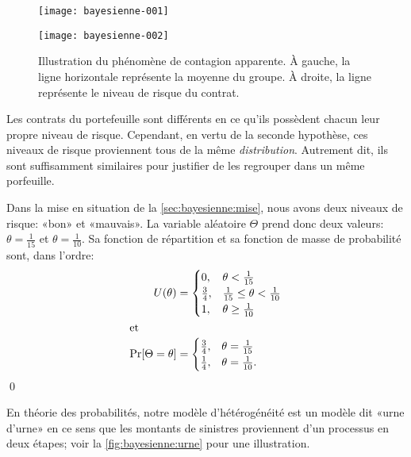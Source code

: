 \begin{figure}
  \centering
  \begin{minipage}{0.48\linewidth}
\texttt{[image: bayesienne-001]}
  \end{minipage}
  \hfill
  \begin{minipage}{0.48\linewidth}
\texttt{[image: bayesienne-002]}
  \end{minipage}
  \caption{Illustration du phénomène de contagion apparente. À gauche,
    la ligne horizontale représente la moyenne du groupe. À droite, la
    ligne représente le niveau de risque du contrat.}
  \label{fig:bayesienne:contagion}
\end{figure}

Les contrats du portefeuille sont différents en ce qu'ils possèdent
chacun leur propre niveau de risque. Cependant, en vertu de la seconde
hypothèse, ces niveaux de risque proviennent tous de la même
\emph{distribution}. Autrement dit, ils sont suffisamment similaires
pour justifier de les regrouper dans un même porfeuille.

\begin{exemple}
  Dans la mise en situation de la \autoref{sec:bayesienne:mise}, nous
  avons deux niveaux de risque: «bon» et «mauvais». La variable
  aléatoire $\Theta$ prend donc deux valeurs: $\theta = \frac{1}{15}$
  et $\theta = \frac{1}{10}$. Sa fonction de répartition et sa
  fonction de masse de probabilité sont, dans l'ordre:
  \begin{align*}
    U(\theta)
    &=
    \begin{cases}
      0,           & \theta < \frac{1}{15} \\
      \frac{3}{4}, &\frac{1}{15} \leq \theta < \frac{1}{10} \\
      1,           &\theta \geq \frac{1}{10}
    \end{cases} \\
    \intertext{et}
    \Pr[\Theta = \theta]
    &=
    \begin{cases}
      \frac{3}{4}, & \theta = \frac{1}{15} \\
      \frac{1}{4}, & \theta = \frac{1}{10}.
    \end{cases}
  \end{align*}
  \qed
\end{exemple}

En théorie des probabilités, notre modèle d'hétérogénéité est un
modèle dit «urne d'urne» en ce sens que les montants de sinistres
proviennent d'un processus en deux étapes; voir la
\autoref{fig:bayesienne:urne} pour une illustration.

